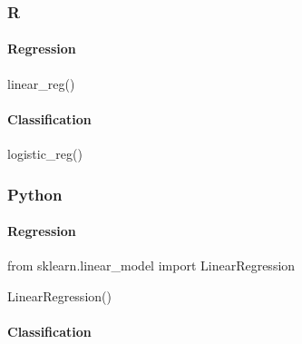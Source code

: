 \documentclass[
  letterpaper,
  DIV=11,
  numbers=noendperiod]{scrreprt}
\newenvironment{Shaded}{\begin{snugshade}}{\end{snugshade}}
\newcommand{\FunctionTok}[1]{\textcolor[rgb]{0.28,0.35,0.67}{#1}}
\newcommand{\ImportTok}[1]{\textcolor[rgb]{0.00,0.46,0.62}{#1}}
\newcommand{\NormalTok}[1]{\textcolor[rgb]{0.00,0.46,0.62}{#1}}
\let\oldparagraph\paragraph
\renewcommand{\paragraph}[1]{\oldparagraph{#1}\mbox{}}
\begin{document}
\hypertarget{r-72}{%
\subsubsection{R}\label{r-72}}

\hypertarget{regression}{%
\paragraph{Regression}\label{regression}}

\begin{Shaded}
\begin{Highlighting}[]
\FunctionTok{linear\_reg}\NormalTok{()}
\end{Highlighting}
\end{Shaded}

\hypertarget{classification}{%
\paragraph{Classification}\label{classification}}

\begin{Shaded}
\begin{Highlighting}[]
\FunctionTok{logistic\_reg}\NormalTok{()}
\end{Highlighting}
\end{Shaded}

\hypertarget{python-72}{%
\subsubsection{Python}\label{python-72}}

\hypertarget{regression-1}{%
\paragraph{Regression}\label{regression-1}}

\begin{Shaded}
\begin{Highlighting}[]
\ImportTok{from}\NormalTok{ sklearn.linear\_model }\ImportTok{import}\NormalTok{ LinearRegression}

\NormalTok{LinearRegression()}
\end{Highlighting}
\end{Shaded}

\hypertarget{classification-1}{%
\paragraph{Classification}\label{classification-1}}
\end{document}
